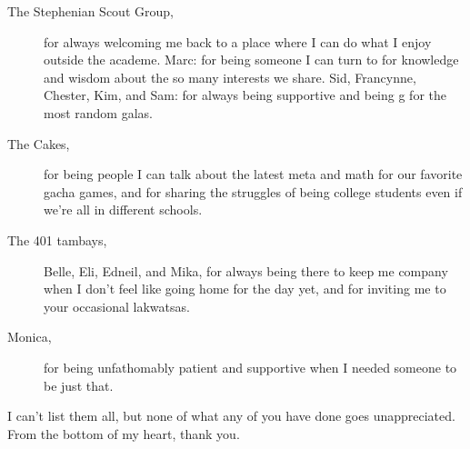 \begin{description}
    \item[The Stephenian Scout Group,] for always welcoming me back to a place where I can do what I enjoy outside the academe. Marc: for being someone I can turn to for knowledge and wisdom about the so many interests we share. Sid, Francynne, Chester, Kim, and Sam: for always being supportive and being g for the most random galas. 
    \item[The Cakes,] for being people I can talk about the latest meta and math for our favorite gacha games, and for sharing the struggles of being college students even if we're all in different schools. 
    \item[The 401 tambays,] Belle, Eli, Edneil, and Mika, for always being there to keep me company when I don't feel like going home for the day yet, and for inviting me to your occasional lakwatsas.
    \item[Monica,] for being unfathomably patient and supportive when I needed someone to be just that.
\end{description}

I can't list them all, but none of what any of you have done goes unappreciated. From the bottom of my heart, thank you.

